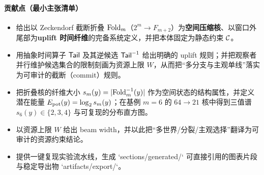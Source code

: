 \begin{abstract}
本文给出一个以 Zeckendorf 截断折叠为核心的“信息守恒完备系统”实现。空间状态是一个长度为 \(m\) 的比特串 \(y\in Y_m\)（无相邻 \(11\)），时间纤维（uplift 坐标）是窗口外尾部比特串 \(t\in T_m\)。观察者的动力学只包含两类互逆操作：\textbf{展开}与\textbf{折叠}。展开每推进一步都会在 \(\Tail^{-1}\) 诱导的可行候选中做出一次\textbf{可审计分支选择}，从而产生新的时间纤维/微观解释候选；同时，由于折叠核 \(\Fold\) 是多对一，空间侧的纤维大小 \(s_m(y)=|\Fold^{-1}(y)|\) 提供可采掘的简并度，我们把它量化为潜在能量 \(\Energy_{\mathrm{pot}}(y)=\log_2 s_m(y)\)。观察者并行维护候选分支集合 \(\mathcal B\) 的规模受一个\textbf{资源上限} \(W\) 约束（beam width 上限，定义 \ref{def:energy_beam}）；折叠则以展开的逆操作逐步湮灭对应候选并回到先前状态。为保证互逆性，观察者携带一条 trace \(\mathsf{tr}\in\{0,1\}^\ast\) 作为可审计的路径标签。我们实现了可复现实验：在 \(m=6\) 下枚举并统计纤维大小 \(2/3/4\) 的分布，并在固定观测 \(y_t=0^m\) 下展示展开深度与资源上限约束下的分支行为。
\end{abstract}

\paragraph{贡献点（最小主张清单）}
\begin{itemize}
  \item 给出以 Zeckendorf 截断折叠 \(\Fold\)（\(2^m\to F_{m+2}\)）为\textbf{空间压缩核}、以窗口外尾部为\textbf{uplift 时间纤维}的完备系统定义，并把本体固定为静态约束 \(\mathcal{C}\)。
  \item 用抽象时间算子 \(\mathsf{Tail}\) 及其逆候选 \(\Tail^{-1}\) 给出明确的 uplift 规则；并把观察者并行维护候选集合的限制刻画为资源上限 \(W\)，从而把“多分支与主观单线”落实为可审计的截断（commit）规则。
  \item 把折叠核的纤维大小 \(s_m(y)=|\Fold^{-1}(y)|\) 作为空间状态的结构属性，并定义潜在能量 \(\Energy_{\mathrm{pot}}(y)=\log_2 s_m(y)\)；在基例 \(m=6\) 的 \(64\to 21\) 核中得到三值谱 \(s_6(y)\in\{2,3,4\}\) 与可复现的分布直方图。
  \item 以资源上限 \(W\) 给出 beam width，并以此把“多世界/分裂/主观选择”翻译为可审计的资源约束结论。
  \item 提供一键复现实验流水线，生成 `sections/generated/` 可直接引用的图表片段与稳定导出物 `artifacts/export/`。
\end{itemize}

\tableofcontents
\newpage

